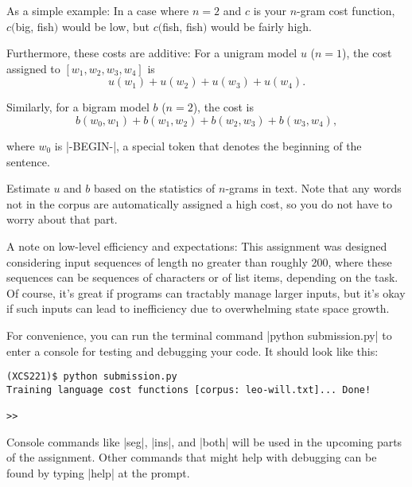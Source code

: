 As a simple example: In a case where $n=2$ and $c$ is your $n$-gram cost
function, $c(${\sf big}, {\sf fish}$)$ would be low, but $c(${\sf fish},
{\sf fish}$)$ would be fairly high.

Furthermore, these costs are additive: For a unigram model $u$ ($n = 1$), the
cost assigned to $[w_1, w_2, w_3, w_4]$ is
\[
u(w_1) + u(w_2) + u(w_3) + u(w_4).
\]

Similarly, for a bigram model $b$ ($n = 2$), the cost is
\[
b(w_0, w_1) +
b(w_1, w_2) +
b(w_2, w_3) +
b(w_3, w_4),
\]

where $w_0$ is |-BEGIN-|, a special token that denotes the beginning of the
sentence.

Estimate $u$ and $b$ based on the statistics of $n$-grams in text. Note
that any words not in the corpus are automatically assigned a high cost, so you
do not have to worry about that part.

A note on low-level efficiency and expectations: This assignment was designed
considering input sequences of length no greater than roughly 200, where these
sequences can be sequences of characters or of list items, depending on the
task.  Of course, it's great if programs can tractably manage larger inputs, but
it's okay if such inputs can lead to inefficiency due to overwhelming state
space growth.

For convenience, you can run the terminal command |python submission.py| to
enter a console for testing and debugging your code.  It should look like this:
\begin{lstlisting}
(XCS221)$ python submission.py
Training language cost functions [corpus: leo-will.txt]... Done!

>> 
\end{lstlisting}

Console commands like |seg|, |ins|, and |both| will be used in the upcoming
parts of the assignment.  Other commands that might help with debugging can be
found by typing |help| at the prompt.